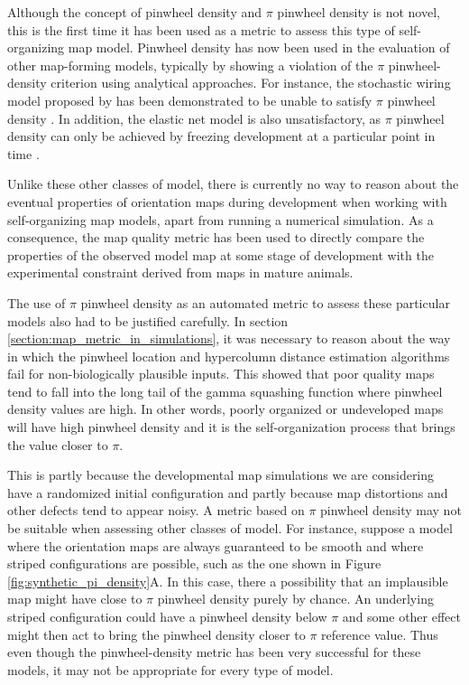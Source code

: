 \documentclass[phd,ianc,twoside]{infthesis}
\begin{document}
Although the concept of pinwheel density and $\pi$ pinwheel density is
not novel, this is the first time it has been used as a metric to assess
this type of self-organizing map model. Pinwheel density has now been used
in the evaluation of other map-forming models, typically by showing a
violation of the $\pi$ pinwheel-density criterion using analytical
approaches. For instance, the stochastic wiring model proposed by
\citet{ringach_natneuro11} has been demonstrated to be unable to satisfy
$\pi$ pinwheel density \citep{schottdorf_plos15}. In addition, the
elastic net model is also unsatisfactory, as $\pi$ pinwheel density can
only be achieved by freezing development at a particular point in time
\citep{keil_neuralsys11}.

Unlike these other classes of model, there is currently no way to reason
about the eventual properties of orientation maps during development
when working with self-organizing map models, apart from running a numerical
simulation. As a consequence, the map quality metric has been used to
directly compare the properties of the observed model map at some stage
of development with the experimental constraint derived from maps in
mature animals.

The use of $\pi$ pinwheel density as an automated metric to assess these
particular models also had to be justified carefully. In section
\ref{section:map_metric_in_simulations}, it was necessary to reason
about the way in which the pinwheel location and hypercolumn distance
estimation algorithms fail for non-biologically plausible inputs. This
showed that poor quality maps tend to fall into the long tail of the
gamma squashing function where pinwheel density values are high. In
other words, poorly organized or undeveloped maps will have high
pinwheel density and it is the self-organization process that
brings the value closer to $\pi$.

This is partly because the developmental map simulations we are
considering have a randomized initial configuration and partly because
map distortions and other defects tend to appear noisy. A metric based
on $\pi$ pinwheel density may not be suitable when assessing other
classes of model. For instance, suppose a model where the orientation
maps are always guaranteed to be smooth and where striped configurations
are possible, such as the one shown in Figure
\ref{fig:synthetic_pi_density}A. In this case, there a possibility that
an implausible map might have close to $\pi$ pinwheel density purely by
chance. An underlying striped configuration could have a pinwheel
density below $\pi$ and some other effect might then act to bring the
pinwheel density closer to $\pi$ reference value.  Thus even though
the pinwheel-density metric has been very successful for these
models, it may not be appropriate for every type of model.
\end{document}
